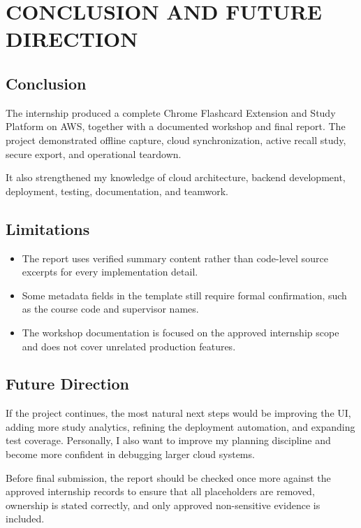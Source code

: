 \chapter{CONCLUSION AND FUTURE DIRECTION}

\section{Conclusion}

The internship produced a complete Chrome Flashcard Extension and Study
Platform on AWS, together with a documented workshop and final report. The
project demonstrated offline capture, cloud synchronization, active recall
study, secure export, and operational teardown.

It also strengthened my knowledge of cloud architecture, backend development,
deployment, testing, documentation, and teamwork.

\section{Limitations}

\begin{itemize}
  \item The report uses verified summary content rather than code-level source
  excerpts for every implementation detail.
  \item Some metadata fields in the template still require formal confirmation,
  such as the course code and supervisor names.
  \item The workshop documentation is focused on the approved internship scope
  and does not cover unrelated production features.
\end{itemize}

\section{Future Direction}

If the project continues, the most natural next steps would be improving the UI,
adding more study analytics, refining the deployment automation, and expanding
test coverage. Personally, I also want to improve my planning discipline and
become more confident in debugging larger cloud systems.

Before final submission, the report should be checked once more against the
approved internship records to ensure that all placeholders are removed,
ownership is stated correctly, and only approved non-sensitive evidence is
included.
